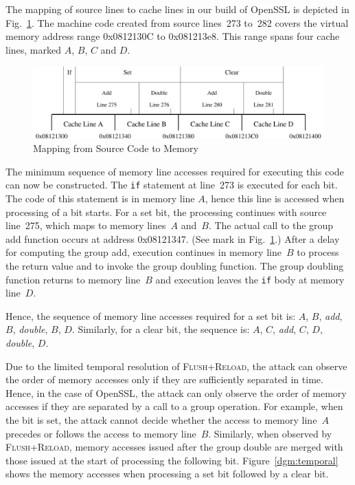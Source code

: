\documentclass[twocolumn]{svjour3}
\begin{document}
The mapping of source lines to cache lines in our build of OpenSSL is depicted in Fig.~\ref{dgm:memory}.
The machine code created from source lines~273 to~282 covers the virtual memory address range 0x0812130C
to 0x081213e8.
This range spans four cache lines, marked $A$, $B$, $C$ and $D$.


\begin{figure}[htb]
\centering\includegraphics[width=\columnwidth]{images/memory}
\caption{Mapping from Source Code to Memory\label{dgm:memory}}
\end{figure}


The minimum sequence of memory line accesses required for executing this code can now be constructed.
The \texttt{if} statement at line~273 is executed for each bit.  
The code of this statement is in memory line $A$, hence this line is accessed when processing of a bit starts.
For a set bit, the processing continues with source line~275, which maps to memory lines~$A$ and~$B$.
The actual call to the group add function occurs at address 0x08121347.
(See mark in Fig.~\ref{dgm:memory}.)
After a delay for computing the group add, execution continues in memory line~$B$ to process the return value and 
to invoke the group doubling function.
The group doubling function returns to memory line~$B$ and execution leaves the \texttt{if} body at memory line~$D$.

Hence, the sequence of memory line accesses required for a set bit is: $A$, $B$, \textit{add}, $B$, \textit{double}, $B$, $D$.
Similarly, for a clear bit, the sequence is: $A$, $C$, \textit{add}, $C$, $D$, \textit{double}, $D$.

Due to the limited temporal resolution of \textsc{Flush+Reload}, the attack can observe the order of memory accesses only
if they are sufficiently separated in time.
Hence, in the case of OpenSSL, the attack can only observe the order of memory accesses if they are separated by a call
to a group operation.
For example, when the bit is set, the attack cannot decide whether the access to memory line~$A$ precedes or follows the access
to memory line~$B$.
Similarly, when observed by \textsc{Flush+Reload}, memory accesses issued after the group double are merged with those 
issued at the start of processing the following bit.
Figure~\ref{dgm:temporal} shows the memory accesses when processing a set bit followed by
a clear bit.
\end{document}
